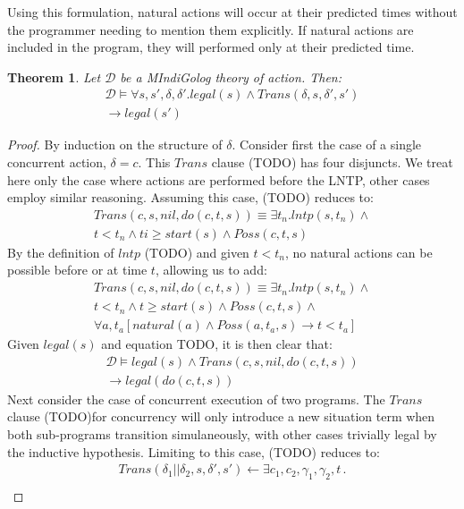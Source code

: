 \documentclass[letterpaper]{article}
\newtheorem{theorem}{Theorem}
\begin{document}
Using this formulation, natural actions will occur at their predicted
times without the programmer needing to mention them explicitly. If
natural actions are included in the program, they will performed only
at their predicted time.


\begin{theorem}
Let $\mathcal{D}$ be a MIndiGolog theory of action. Then:
\begin{multline*}
\mathcal{D} \models \forall s,s',\delta,\delta'.legal(s)\wedge Trans(\delta,s,\delta',s')\\
\rightarrow legal(s')
\end{multline*}
\end{theorem}

\begin{proof}
By induction on the structure of $\delta$.
Consider first the case of a single concurrent action, $\delta=c$.  This
$Trans$ clause (TODO) has four disjuncts. We treat here only the
case where actions are performed before the LNTP, other
cases employ similar reasoning.
Assuming this case, (TODO) reduces to:
\begin{multline*}
Trans(c,s,nil,do(c,t,s)) \equiv \exists t_n . lntp(s,t_n) \wedge \\
  t < t_n \wedge ti \geq start(s) \wedge Poss(c,t,s)
\end{multline*}
By the definition of $lntp$ (TODO) and given $t < t_n$, no natural actions
can be possible before or at time $t$, allowing us to add:
\begin{multline*}
Trans(c,s,nil,do(c,t,s)) \equiv \exists t_n . lntp(s,t_n) \wedge \\
  t < t_n \wedge t \geq start(s) \wedge Poss(c,t,s) \wedge\\
  \forall a,t_a \left[ natural(a) \wedge Poss(a,t_a,s) \rightarrow t < t_a \right]
\end{multline*}
Given $legal(s)$ and equation TODO, it is then clear that:
\begin{multline*}
\mathcal{D} \models legal(s) \wedge Trans(c,s,nil,do(c,t,s))\\
\rightarrow legal(do(c,t,s))
\end{multline*}
Next consider the case of concurrent execution of two programs.  The $Trans$
clause (TODO)for concurrency will only introduce a new situation term when both
sub-programs transition simulaneously, with other cases trivially legal by
the inductive hypothesis.  Limiting to this case, (TODO) reduces to:
\begin{multline*}
Trans(\delta_{1}||\delta_{2},s,\delta',s')\leftarrow \exists c_{1},c_{2},\gamma_{1},\gamma_{2},t\,.\\

\end{multline*}
\end{proof}
\end{document}
